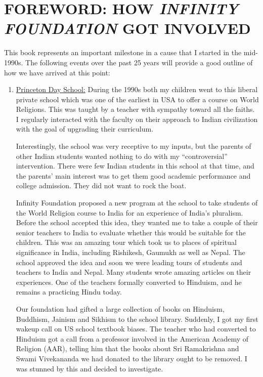 \chapter*{FOREWORD: HOW \textit{INFINITY FOUNDATION} GOT INVOLVED}

This book represents an important milestone in a cause that I started in the mid-1990s. The following events over the past 25 years will provide a good outline of how we have arrived at this point:

\begin{enumerate}
\item \underline{Princeton Day School:} During the 1990s both my children went to this liberal private school which was one of the earliest in USA to offer a course on World Religions. This was taught by a teacher with sympathy toward all the faiths. I regularly interacted with the faculty on their approach to Indian civilization with the goal of upgrading their curriculum. 

Interestingly, the school was very receptive to my inputs, but the parents of other Indian students wanted nothing to do with my “controversial” intervention. There were few Indian students in this school at that time, and the parents’ main interest was to get them good academic performance and college admission. They did not want to rock the boat.

Infinity Foundation proposed a new program at the school to take students of the World Religion course to India for an experience of India’s pluralism. Before the school accepted this idea, they wanted me to take a couple of their senior teachers to India to evaluate whether this would be suitable for the children. This was an amazing tour which took us to places of spiritual significance in India, including Rishikesh, Gaumukh as well as Nepal. The school approved the idea and soon we were leading tours of students and teachers to India and Nepal. Many students wrote amazing articles on their experiences. One of the teachers formally converted to Hinduism, and he remains a practicing Hindu today.

Our foundation had gifted a large collection of books on Hinduism, Buddhism, Jainism and Sikhism to the school library. Suddenly, I got my first wakeup call on US school textbook biases. The teacher who had converted to Hinduism got a call from a professor involved in the American Academy of Religion (AAR), telling him that the books about Sri Ramakrishna and Swami Vivekananda we had donated to the library ought to be removed. I was stunned by this and decided to investigate.


\end{enumerate}
